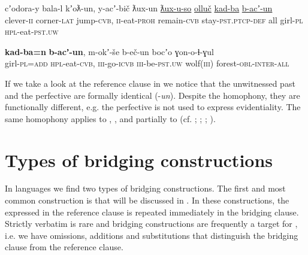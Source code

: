 \documentclass[output=paper]{LSP/langsci}
\begin{document}
\begin{exe}
	\ex	\label{ex:5ab}
	\begin{xlist}
		\ex	\label{ex:5a}
		\gll	 cʼodora-y   	bala-l    	kʼoƛ-un, 		y-acʼ-bič 		ƛux-un \underline{ƛux-u-so} 				\underline{olluč}      	\underline{kad-ba}   \underline{b-acʼ-un}\\
			clever-\textsc{ii} 	corner-\textsc{lat}  	jump-\textsc{cvb},	\textsc{ii}-eat-\textsc{proh}  	remain-\textsc{cvb} stay-\textsc{pst.ptcp-def}		all 			girl-\textsc{pl}   	\textsc{hpl}-eat-\textsc{pst.uw}   \\
		\glt	{}

		\ex	\label{ex:5b}
		\gll	\textbf{kad-ba=n}    	\textbf{b-acʼ-un}, 		m-okʼ-še 		b-eč-un bocʼo 	ɣon-o-ɬ-ɣul \\
			girl-\textsc{pl=add}  	\textsc{hpl}-eat-\textsc{cvb}, 	\textsc{iii}-go-\textsc{icvb}	\textsc{iii}-be-\textsc{pst.uw} wolf(\textsc{iii})   	forest-\textsc{obl-inter-all} \\
		\glt	{}
	\end{xlist}
\end{exe}


If we take a look at the reference clause in  we notice that the unwitnessed past and the perfective  are formally identical (-\textit{un}). Despite the homophony, they are functionally different, e.g. the perfective  is not used to express evidentiality. The same homophony applies to , , and partially to  (cf. \citealt[244]{Forker.2013a}; \citealt[391]{Khalilova.2009}; \citealt{Khalilova.2011}; \citealt{Comrie.et.al.2016}). 



\section{Types of bridging constructions}
\label{sec:Types of bridging constructions}
In  languages we find two types of bridging constructions. The first and most common construction is  that will be discussed in . In these constructions, the  expressed in the reference clause is repeated immediately in the bridging clause. Strictly verbatim  is rare  and bridging constructions are frequently a target for , i.e. we have omissions, additions and substitutions that distinguish the bridging clause from the reference clause. 
\end{document}
